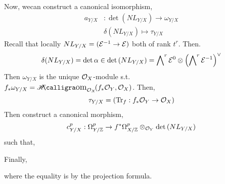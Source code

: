 \documentclass[12pt]{article}
\begin{document}
\begin{remark}
Now, wecan construct a canonical isomorphism,
\begin{align*}
a_{Y / X} & : \det{(NL_{Y/X})} \to \omega_{Y / X}
\\
& \delta(NL_{Y/X}) \mapsto \tau_{Y/X}
\end{align*}
Recall that locally $NL_{Y/X} = (\mathcal{E}^{-1} \to \mathcal{E})$ both of rank $t^r$. Then.
\[ \delta(NL_{Y/ X}) = \det{\alpha} \in \det{(NL_{Y/X})} = \bigwedge\nolimits^r \mathcal{E}^0 \otimes \left( \bigwedge\nolimits^r \mathcal{E}^{-1} \right)^\vee \]
Then $\omega_{Y / X}$ is the unique $\mathcal{O}_{X}$-module s.t. $f_* \omega_{Y / X} = \shHom{\struct{X}}{f_* \struct{Y}}{\struct{X}}$. Then,
\[ \tau_{Y/X} = (\mathrm{Tr}_f : f_* \mathcal{O}_{Y} \to \mathcal{O}_{X}) \]
Then construct a canonical morphism,
\[ c_{Y / X}^p : \Omega^p_{Y / \mathbb{Z}} \to f^* \Omega^p_{X / \mathbb{Z}} \otimes_{\mathcal{O}_{Y}} \det{(NL_{Y / X})} \]
such that,
\begin{center}
\end{center}
Finally,
\begin{center}
\end{center}
where the equality is by the projection formula.
\end{remark}
\end{document}
